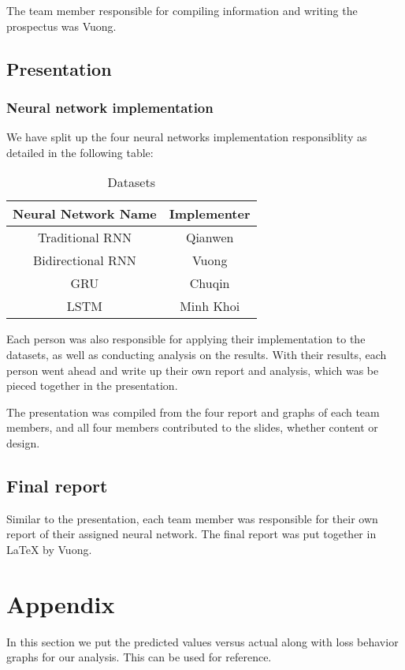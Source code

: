 \documentclass[letterpaper, 10 pt, conference]{ieeeconf}  %
\begin{document}
        The team member responsible for compiling information and writing the prospectus was Vuong.

    \subsection{Presentation}
        \subsubsection{Neural network implementation} We have split up the four neural networks implementation responsiblity as detailed in the following table:
            \begin{table}[h!] \centering
                \caption{Datasets}
                \begin{threeparttable}
                    \begin{tabular}{|c|c|}
                        \hline
                        Neural Network Name & Implementer\\
                        \hline
                        Traditional RNN & Qianwen\\
                        Bidirectional RNN & Vuong\\
                        GRU & Chuqin\\
                        LSTM & Minh Khoi\\
                        \hline
                    \end{tabular}
                \end{threeparttable}
            \end{table}

        Each person was also responsible for applying their implementation to the datasets, as well as conducting analysis on the results. With their results, each person went ahead and write up their own report and analysis, which was be pieced together in the presentation.

        The presentation was compiled from the four report and graphs of each team members, and all four members contributed to the slides, whether content or design.

    \subsection{Final report}
        Similar to the presentation, each team member was responsible for their own report of their assigned neural network. The final report was put together in LaTeX by Vuong.

\section{Appendix}
    In this section we put the predicted values versus actual along with loss behavior graphs for our analysis. This can be used for reference.

\cite{PURUSHOTHAM2018112}



\end{document}
